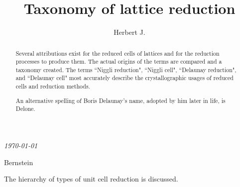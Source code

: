 \documentclass[preprint]{iucr}              %
\numberwithin{equation}{section}
\begin{document}
	
	
	
	{\LARGE \emph{\today}} \\
	\title{Taxonomy of lattice reduction}
	
	
	\author[b]{Herbert J.}{Bernstein}
	
	
	
	
	
	
	
	
	\maketitle                        %
	
	\begin{synopsis}
		The hierarchy of types of unit cell reduction is discussed.
	\end{synopsis}
	
	\begin{abstract}
		Several attributions exist for the reduced cells of lattices
		and for the reduction processes to produce them. The actual
		origins of the terms are compared and a taxonomy created. The
		terms ``Niggli reduction", ``Niggli cell", ``Delaunay reduction",
		and ``Delaunay cell" most accurately describe the crystallographic usages
		of reduced cells and reduction methods. 
		
		An alternative spelling of Boris  Delaunay's name, adopted by him
		later in life, is Delone.
	\end{abstract}
	
\end{document}
